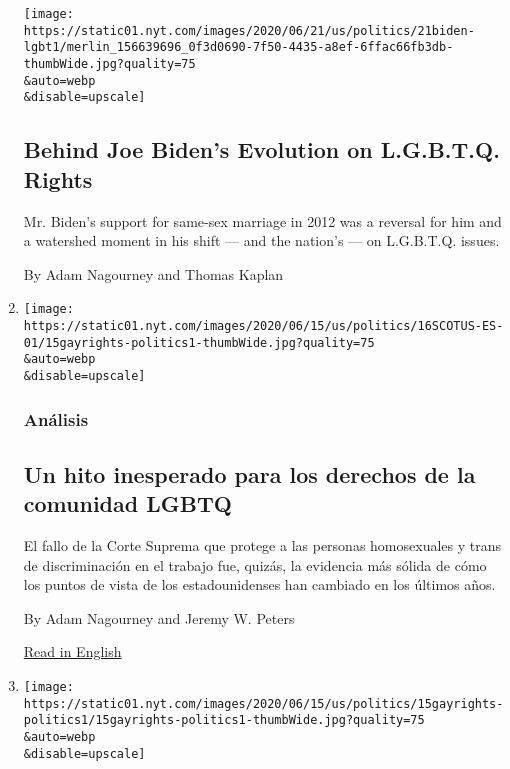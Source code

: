 \begin{enumerate}
  \texttt{[image: https://static01.nyt.com/images/2020/06/21/us/politics/21biden-lgbt1/merlin\_156639696\_0f3d0690-7f50-4435-a8ef-6ffac66fb3db-thumbWide.jpg?quality=75\\\&auto=webp\\\&disable=upscale]}

  \hypertarget{behind-joe-bidens-evolution-on-lgbtq-rights}{%
  \subsection{Behind Joe Biden's Evolution on L.G.B.T.Q.
  Rights}\label{behind-joe-bidens-evolution-on-lgbtq-rights}}

  Mr. Biden's support for same-sex marriage in 2012 was a reversal for
  him and a watershed moment in his shift --- and the nation's --- on
  L.G.B.T.Q. issues.

  By Adam Nagourney and Thomas Kaplan
\item
  \href{/es/2020/06/17/espanol/derechos-lgbtq-corte-suprema.html}{}

  \texttt{[image: https://static01.nyt.com/images/2020/06/15/us/politics/16SCOTUS-ES-01/15gayrights-politics1-thumbWide.jpg?quality=75\\\&auto=webp\\\&disable=upscale]}

  \hypertarget{anuxe1lisis}{%
  \subsubsection{Análisis}\label{anuxe1lisis}}

  \hypertarget{un-hito-inesperado-para-los-derechos-de-la-comunidad-lgbtq}{%
  \subsection{Un hito inesperado para los derechos de la comunidad
  LGBTQ}\label{un-hito-inesperado-para-los-derechos-de-la-comunidad-lgbtq}}

  El fallo de la Corte Suprema que protege a las personas homosexuales y
  trans de discriminación en el trabajo fue, quizás, la evidencia más
  sólida de cómo los puntos de vista de los estadounidenses han cambiado
  en los últimos años.

  By Adam Nagourney and Jeremy W. Peters

  \href{https://www.nytimes.com/2020/06/15/us/politics/supreme-court-lgbtq-rights.html}{Read
  in English}
\item
  \href{/2020/06/15/us/politics/supreme-court-lgbtq-rights.html}{}

  \texttt{[image: https://static01.nyt.com/images/2020/06/15/us/politics/15gayrights-politics1/15gayrights-politics1-thumbWide.jpg?quality=75\\\&auto=webp\\\&disable=upscale]}


\end{enumerate}
